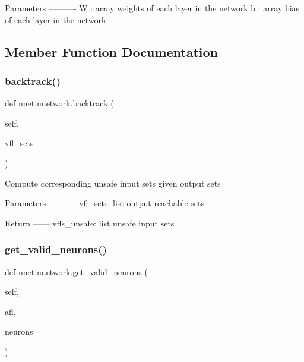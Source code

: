 \begin{DoxyVerb}Parameters
----------
W : array
    weights of each layer in the network
b : array
    bias of each layer in the network
\end{DoxyVerb}
 

\subsection{Member Function Documentation}
\mbox{\label{classnnet_1_1nnetwork_a6298ba244c8288b4be06ca140be7fafa}} 
\subsubsection{\texorpdfstring{backtrack()}{backtrack()}}
{\footnotesize\ttfamily def nnet.\+nnetwork.\+backtrack (\begin{DoxyParamCaption}\item[{}]{self,  }\item[{}]{vfl\+\_\+sets }\end{DoxyParamCaption})}

\begin{DoxyVerb}Compute corresponding unsafe input sets given output sets

Parameters
----------
vfl_sets: list
    output reachable sets

Return
------
vfls_unsafe: list
    unsafe input sets
\end{DoxyVerb}
 \mbox{\label{classnnet_1_1nnetwork_a764b3d1d0f1c3c164b4c3a9ee9bedeed}} 
\subsubsection{\texorpdfstring{get\+\_\+valid\+\_\+neurons()}{get\_valid\_neurons()}}
{\footnotesize\ttfamily def nnet.\+nnetwork.\+get\+\_\+valid\+\_\+neurons (\begin{DoxyParamCaption}\item[{}]{self,  }\item[{}]{afl,  }\item[{}]{neurons }\end{DoxyParamCaption})}

